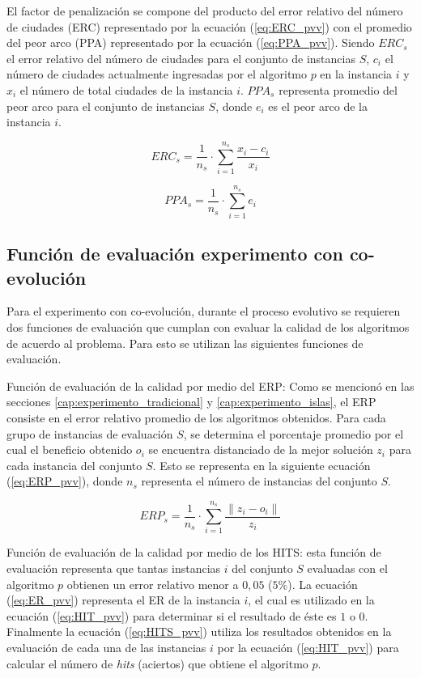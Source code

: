 El factor de penalización se compone del producto del error relativo del número de ciudades (ERC) representado por la ecuación (\ref{eq:ERC_pvv}) con el promedio del peor arco (PPA) representado por la ecuación (\ref{eq:PPA_pvv}). Siendo $ERC_{s}$ el error relativo del número de ciudades para el conjunto de instancias $S$, $c_{i}$ el número de ciudades actualmente ingresadas por el algoritmo $p$ en la instancia $i$ y $x_{i}$ el número de total ciudades de la instancia $i$. $PPA_{s}$ representa promedio del peor arco para el conjunto de instancias $S$, donde $e_{i}$ es el peor arco de la instancia $i$.

\begin{equation}
\label{eq:ERC_pvv}
	ERC_{s} = \frac{1}{n_{s}} \cdot \sum\limits_{i=1}^{n_{s}} \frac{x_{i} - c_{i}}{x_{i}} 
\end{equation}

\begin{equation}
\label{eq:PPA_pvv}
	PPA_{s} = \frac{1}{n_{s}} \cdot \sum\limits_{i=1}^{n_{s}} e_{i}
\end{equation}

\subsection{Función de evaluación experimento con co-evolución}

Para el experimento con co-evolución, durante el proceso evolutivo se requieren dos funciones de evaluación que cumplan con evaluar la calidad de los algoritmos de acuerdo al problema. Para esto se utilizan las siguientes funciones de evaluación.

Función de evaluación de la calidad por medio del ERP: Como se mencionó en las secciones \ref{cap:experimento_tradicional} y \ref{cap:experimento_islas}, el ERP consiste en el error relativo promedio de los algoritmos obtenidos. Para cada grupo de instancias de evaluación $S$, se determina el porcentaje promedio por el cual el beneficio obtenido $o_{i}$ se encuentra distanciado de la mejor solución $z_{i}$ para cada instancia del conjunto $S$. Esto se representa en la siguiente ecuación (\ref{eq:ERP_pvv}), donde $n_{s}$ representa el número de instancias del conjunto $S$.

\begin{equation}
\label{eq:ERP_pvv}
	ERP_{s} =  \frac{1}{n_{s}} \cdot \sum\limits_{i=1}^{n_{s}} \frac{\|z_{i} - o_{i}\|}{z_{i}} 
\end{equation}

Función de evaluación de la calidad por medio de los HITS: esta función de evaluación representa que tantas instancias $i$ del conjunto $S$ evaluadas con el algoritmo $p$ obtienen un error relativo menor a $0,05$ ($5\%$). La ecuación (\ref{eq:ER_pvv}) representa el ER de la instancia $i$, el cual es utilizado en la ecuación (\ref{eq:HIT_pvv}) para determinar si el resultado de éste es $1$ o $0$. Finalmente la ecuación (\ref{eq:HITS_pvv}) utiliza los resultados obtenidos en la evaluación de cada una de las instancias $i$ por la ecuación (\ref{eq:HIT_pvv}) para calcular el número de \textit{hits} (aciertos) que obtiene el algoritmo $p$.

